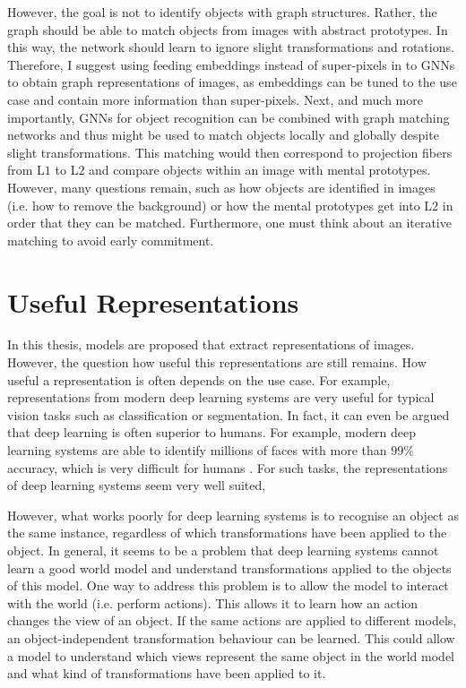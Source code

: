 However, the goal is not to identify objects with graph structures. Rather, the graph should be able to match objects from images with abstract prototypes. In this way, the network should learn to ignore slight transformations and rotations. Therefore, I suggest using feeding embeddings instead of super-pixels in to GNNs to obtain graph representations of images, as embeddings can be tuned to the use case and contain more information than super-pixels. Next, and much more importantly, GNNs for object recognition can be combined with graph matching networks  and thus might be used to match objects locally and globally despite slight transformations. This matching would then correspond to projection fibers from L$1$ to L$2$ and compare objects within an image with mental prototypes. However, many questions remain, such as how objects are identified in images (i.e. how to remove the background) or how the mental prototypes get into L$2$ in order that they can be matched. Furthermore, one must think about an iterative matching to avoid early commitment. 



\section{Useful Representations}
In this thesis, models are proposed that extract representations of images.
However, the question how useful this representations are still remains.
How useful a representation is often depends on the use case. For example, representations from modern deep learning systems are very useful for typical vision tasks such as classification or segmentation. In fact, it can even be argued that deep learning is often superior to humans. For example, modern deep learning systems  are able to identify millions of faces with more than $99\%$ accuracy, which is very difficult for humans . For such tasks, the representations of deep learning systems seem very well suited, 

However, what works poorly for deep learning systems is to recognise an object as the same instance, regardless of which transformations have been applied to the object. In general, it seems to be a problem that deep learning systems cannot learn a good world model and understand transformations applied to the objects of this model. One way to address this problem is to allow the model to interact with the world (i.e. perform actions). This allows it to learn how an action changes the view of an object. If the same actions are applied to different models, an object-independent transformation behaviour can be learned. This could allow a model to understand which views represent the same object in the world model and what kind of transformations have been applied to it.

